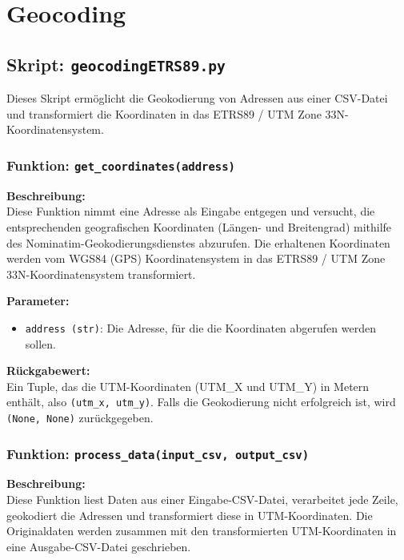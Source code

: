 \section{Geocoding}

\subsection{Skript: \texttt{geocodingETRS89.py}}

Dieses Skript ermöglicht die Geokodierung von Adressen aus einer CSV-Datei und transformiert die Koordinaten in das ETRS89 / UTM Zone 33N-Koordinatensystem.

\subsubsection{Funktion: \texttt{get\_coordinates(address)}}

\textbf{Beschreibung:}\\
Diese Funktion nimmt eine Adresse als Eingabe entgegen und versucht, die entsprechenden geografischen Koordinaten (Längen- und Breitengrad) mithilfe des Nominatim-Geokodierungsdienstes abzurufen. Die erhaltenen Koordinaten werden vom WGS84 (GPS) Koordinatensystem in das ETRS89 / UTM Zone 33N-Koordinatensystem transformiert.

\textbf{Parameter:}
\begin{itemize}
    \item \texttt{address (str)}: Die Adresse, für die die Koordinaten abgerufen werden sollen.
\end{itemize}

\textbf{Rückgabewert:}\\
Ein Tuple, das die UTM-Koordinaten (UTM\_X und UTM\_Y) in Metern enthält, also \texttt{(utm\_x, utm\_y)}. Falls die Geokodierung nicht erfolgreich ist, wird \texttt{(None, None)} zurückgegeben.

\subsubsection{Funktion: \texttt{process\_data(input\_csv, output\_csv)}}

\textbf{Beschreibung:}\\
Diese Funktion liest Daten aus einer Eingabe-CSV-Datei, verarbeitet jede Zeile, geokodiert die Adressen und transformiert diese in UTM-Koordinaten. Die Originaldaten werden zusammen mit den transformierten UTM-Koordinaten in eine Ausgabe-CSV-Datei geschrieben.

